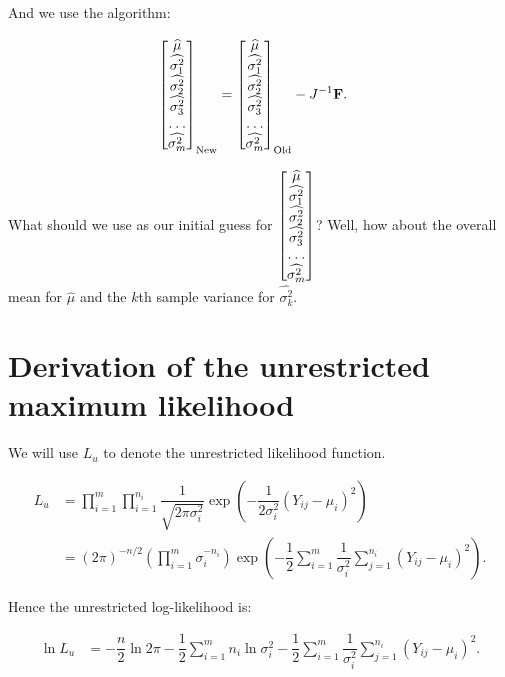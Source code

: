 \documentclass[12pt,a4paper,openright]{article}
\newcommand{\wmu}{\widehat{\mu}}
\newcommand{\wst}[1]{\widehat{\sigma^2_#1}}
\begin{document}
	And we use the algorithm:
	
	\begin{align*}
		\left[\begin{matrix}
			\wmu \\
			\wst{1} \\
			\wst{2} \\
			\wst{3} \\
			\hdotsfor{1} \\
			\wst{m}
		\end{matrix}\right]_{\mathrm{New}} &= \left[\begin{matrix}
		\wmu \\
		\wst{1} \\
		\wst{2} \\
		\wst{3} \\
		\hdotsfor{1} \\
		\wst{m}
	\end{matrix}\right]_{\mathrm{Old}} - J^{-1}\mathbf{F}.
	\end{align*}

	What should we use as our initial guess for $\left[\begin{matrix}
		\wmu \\
		\wst{1} \\
		\wst{2} \\
		\wst{3} \\
		\hdotsfor{1} \\
		\wst{m}
	\end{matrix}\right]$? Well, how about the overall mean for $\wmu$ and the $k$th sample variance for $\wst{k}$. 

	\section{Derivation of the unrestricted maximum likelihood}
	We will use $L_u$ to denote the unrestricted likelihood function.
	
	\begin{align*}
		L_u &= \prod_{i=1}^m \prod_{i=1}^{n_i} \dfrac{1}{\sqrt{2\pi \sigma^2_i}} \exp{\left(-\dfrac{1}{2\sigma^2_i} (Y_{ij}-\mu_i)^2\right)} \\
		&= (2\pi)^{-n/2} \left(\prod_{i=1}^m \sigma_i^{-n_i}\right)\exp{\left(-\dfrac{1}{2}\sum_{i=1}^m \dfrac{1}{\sigma^2_i}\sum_{j=1}^{n_i} (Y_{ij}-\mu_i)^2\right)}.
	\end{align*}

	Hence the unrestricted log-likelihood is:
	
	\begin{align*}
		\ln{L_u} &= -\dfrac{n}{2} \ln{2\pi} - \dfrac{1}{2}\sum_{i=1}^m n_i \ln{\sigma^2_i} - \dfrac{1}{2}\sum_{i=1}^m \dfrac{1}{\sigma^2_i}\sum_{j=1}^{n_i} (Y_{ij}-\mu_i)^2.
	\end{align*}
\end{document}
